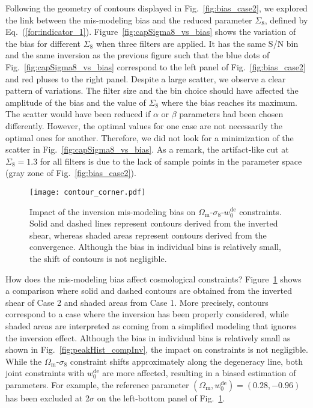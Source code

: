 \documentclass{aa} %
\newcommand{\for}[1]{Eq.~(\ref{#1})}
\newcommand{\fig}[1]{Fig.~\ref{#1}}
\newcommand{\figFull}[1]{Figure~\ref{#1}}
\newcommand{\OmegaM}{\Omega_\mathrm{m}}
\newcommand{\sigEig}{\sigma_8}
\newcommand{\wZero}{w_0^\mathrm{de}}
\begin{document}
Following the geometry of contours displayed in \fig{fig:bias_case2}, we explored the link between the mis-modeling bias and the reduced parameter $\Sigma_8$, defined by \for{for:indicator_1}. \figFull{fig:capSigma8_vs_bias} shows the variation of the bias for different $\Sigma_8$ when three filters are applied. It has the same S/N bin and the same inversion as the previous figure such that the blue dots of \fig{fig:capSigma8_vs_bias} correspond to the left panel of \fig{fig:bias_case2} and red pluses to the right panel. Despite a large scatter, we observe a clear pattern of variations. The filter size and the bin choice should have affected the amplitude of the bias and the value of $\Sigma_8$ where the bias reaches its maximum. The scatter would have been reduced if $\alpha$ or $\beta$ parameters had been chosen differently. However, the optimal values for one case are not necessarily the optimal ones for another. Therefore, we did not look for a minimization of the scatter in \fig{fig:capSigma8_vs_bias}. As a remark, the artifact-like cut at $\Sigma_8=1.3$ for all filters is due to the lack of sample points in the parameter space (gray zone of \fig{fig:bias_case2}). 

\begin{figure}[tb]
        \centering
        \texttt{[image: contour\_corner.pdf]}
        \caption{Impact of the inversion mis-modeling bias on $\OmegaM$-$\sigEig$-$\wZero$ constraints. Solid and dashed lines represent contours derived from the inverted shear, whereas shaded areas represent contours derived from the convergence. Although the bias in individual bins is relatively small, the shift of contours is not negligible.}
        \label{fig:contour_corner}
\end{figure}

How does the mis-modeling bias affect cosmological constraints? \figFull{fig:contour_corner} shows a comparison where solid and dashed contours are obtained from the inverted shear of Case 2 and shaded areas from Case 1. More precisely, contours correspond to a case where the inversion has been properly considered, while shaded areas are interpreted as coming from a simplified modeling that ignores the inversion effect. Although the bias in individual bins is relatively small as shown in \fig{fig:peakHist_compInv}, the impact on constraints is not negligible. While the $\OmegaM$-$\sigEig$ constraint shifts approximately along the degeneracy line, both joint constraints with $\wZero$ are more affected, resulting in a biased estimation of parameters. For example, the reference parameter $(\OmegaM, \wZero) = (0.28, -0.96)$ has been excluded at 2$\sigma$ on the left-bottom panel of \fig{fig:contour_corner}.
\end{document}
